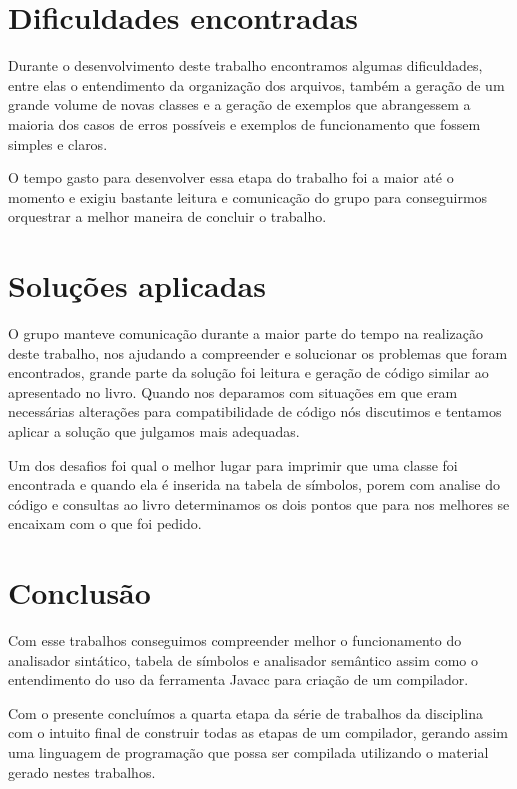\documentclass[
	article,			%
	11pt,				%
	oneside,			%
	a4paper,			%
	portuguese,			%
	brazil,				%
	sumario=tradicional
	]{abntex2}
\begin{document}
\section{Dificuldades encontradas}

Durante o desenvolvimento deste trabalho encontramos algumas dificuldades, entre elas o entendimento da organização dos arquivos, também a geração de um grande volume de novas classes e a geração de exemplos que abrangessem a maioria dos casos de erros possíveis e exemplos de funcionamento que fossem simples e claros.

O tempo gasto para desenvolver essa etapa do trabalho foi a maior até o momento e exigiu bastante leitura e comunicação do grupo para conseguirmos orquestrar a melhor maneira de concluir o trabalho.

\section{Soluções aplicadas}

O grupo manteve comunicação durante a maior parte do tempo na realização deste trabalho, nos ajudando a compreender e solucionar os problemas que foram encontrados, grande parte da solução foi leitura e geração de código similar ao apresentado no livro. Quando nos deparamos com situações em que eram necessárias alterações para compatibilidade de código nós discutimos e tentamos aplicar a solução que julgamos mais adequadas.

Um dos desafios foi qual o melhor lugar para imprimir que uma classe foi encontrada e quando ela é inserida na tabela de símbolos, porem com analise do código e consultas ao livro determinamos os dois pontos que para nos melhores se encaixam com o que foi pedido.

\newpage
\section{Conclusão}

Com esse trabalhos conseguimos compreender melhor o funcionamento do analisador sintático, tabela de símbolos e analisador semântico assim como o entendimento do uso da ferramenta Javacc para criação de um compilador.

Com o presente concluímos a quarta etapa da série de trabalhos da disciplina com o intuito final de construir todas as etapas de um compilador, gerando assim uma linguagem de programação que possa ser compilada utilizando o material gerado nestes trabalhos.

\end{document}
